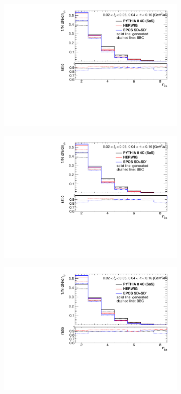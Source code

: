 \begin{figure}[t!]
	\centering
	\begin{subfigure}{.45\textwidth}
		\includegraphics[width=\textwidth,page=4]{chapters/chrgSTAR/img/bbcCorrection/xi_bbc.pdf}
	\end{subfigure}
	\begin{subfigure}{.45\textwidth}
		\includegraphics[width=\textwidth,page=9]{chapters/chrgSTAR/img/bbcCorrection/xi_bbc.pdf}
	\end{subfigure}
	\begin{subfigure}{.45\textwidth}
		\includegraphics[width=\textwidth,page=14]{chapters/chrgSTAR/img/bbcCorrection/xi_bbc.pdf}

\end{subfigure}
\end{figure}
